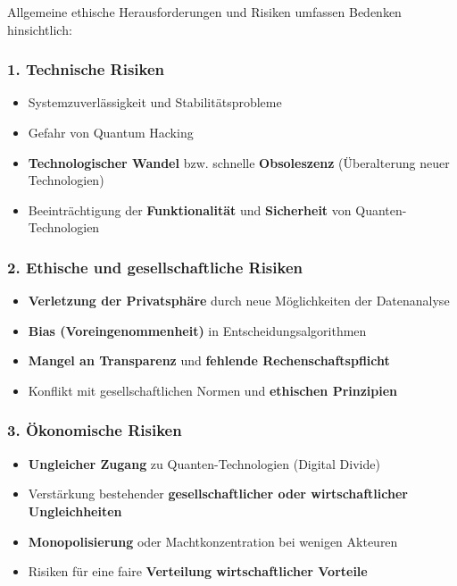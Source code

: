 Allgemeine ethische Herausforderungen und Risiken umfassen Bedenken hinsichtlich:

\subsubsection{\textbf{1. Technische Risiken}}
\begin{itemize}
    \item Systemzuverlässigkeit und Stabilitätsprobleme
    \item Gefahr von Quantum Hacking
    \item \textbf{Technologischer Wandel} bzw. schnelle \textbf{Obsoleszenz} (Überalterung neuer Technologien)
    \item Beeinträchtigung der \textbf{Funktionalität} und \textbf{Sicherheit} von Quanten-Technologien
\end{itemize}

\subsubsection{\textbf{2. Ethische und gesellschaftliche Risiken}}
\begin{itemize}
    \item \textbf{Verletzung der Privatsphäre} durch neue Möglichkeiten der Datenanalyse
    \item \textbf{Bias (Voreingenommenheit)} in Entscheidungsalgorithmen
    \item \textbf{Mangel an Transparenz} und \textbf{fehlende Rechenschaftspflicht}
    \item Konflikt mit gesellschaftlichen Normen und \textbf{ethischen Prinzipien}
\end{itemize}

\subsubsection{\textbf{3. Ökonomische Risiken}}
\begin{itemize}
    \item \textbf{Ungleicher Zugang} zu Quanten-Technologien (Digital Divide)
    \item Verstärkung bestehender \textbf{gesellschaftlicher oder wirtschaftlicher Ungleichheiten}
    \item \textbf{Monopolisierung} oder Machtkonzentration bei wenigen Akteuren
    \item Risiken für eine faire \textbf{Verteilung wirtschaftlicher Vorteile}
\end{itemize}

